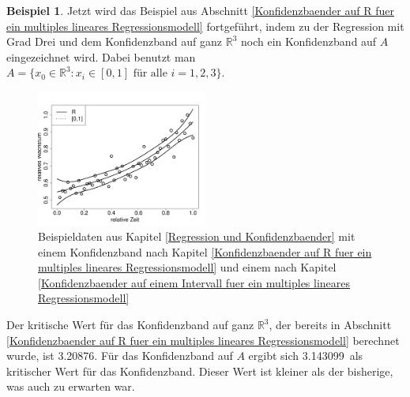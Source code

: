 \documentclass[12pt,a4paper]{article}
\theoremstyle{definition}
\newtheorem{Beispiel}[Definition]{Beispiel}
\theoremstyle{definition}
\theoremstyle{definition}
\theoremstyle{definition}
\newcommand{\cR}{3.20876}
\newcommand{\cA}{3.143099}
\begin{document}
\begin{Beispiel}
Jetzt wird das Beispiel aus Abschnitt \ref{Konfidenzbaender auf R fuer ein multiples lineares Regressionsmodell} fortgeführt, indem zu der Regression mit Grad Drei und dem Konfidenzband auf ganz $\mathbb{R}^{3}$ noch ein Konfidenzband auf $A$ eingezeichnet wird. Dabei benutzt man $A = \{x_{0} \in \mathbb{R}^3 : x_i \in [0,1] \text{ für alle } i=1, 2, 3 \} $. 


\begin{figure}[H] 
  \centering
     \includegraphics[width=0.5\textwidth]{Bsp-KB-minmax}
  \caption{Beispieldaten aus Kapitel \ref{Regression und Konfidenzbaender} mit einem Konfidenzband nach Kapitel \ref{Konfidenzbaender auf R fuer ein multiples lineares Regressionsmodell} und einem nach Kapitel \ref{Konfidenzbaender auf einem Intervall fuer ein multiples lineares Regressionsmodell}}
  \label{KB-minmax-BSP}
\end{figure}

Der kritische Wert für das Konfidenzband auf ganz $\mathbb{R}^3$, der bereits in Abschnitt \ref{Konfidenzbaender auf R fuer ein multiples lineares Regressionsmodell} berechnet wurde, ist \cR . Für das Konfidenzband auf $A$ ergibt sich \cA ~als kritischer Wert für das Konfidenzband. Dieser Wert ist kleiner als der bisherige, was auch zu erwarten war.
\end{Beispiel}
\end{document}
